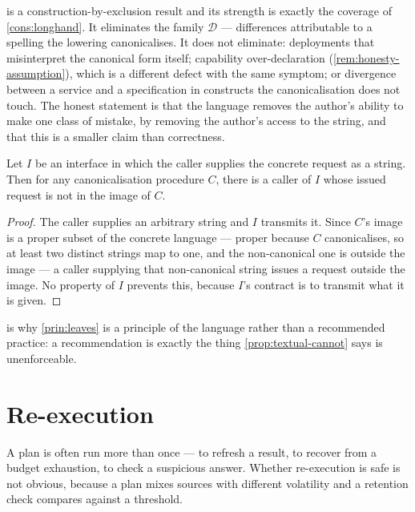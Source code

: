 \begin{remark}
\label{rem:interp-scope}
 is a construction-by-exclusion result and its strength
is exactly the coverage of \cref{cons:longhand}. It eliminates the family
$\mathcal{D}$ --- differences attributable to a spelling the lowering
canonicalises. It does not eliminate: deployments that misinterpret the
canonical form itself; capability over-declaration
(\cref{rem:honesty-assumption}), which is a different defect with the same
symptom; or divergence between a service and a specification in constructs the
canonicalisation does not touch. The honest statement is that the language
removes the author's ability to make one class of mistake, by removing the
author's access to the string, and that this is a smaller claim than
correctness.
\end{remark}

\begin{proposition}
\label{prop:textual-cannot}
Let $I$ be an interface in which the caller supplies the concrete request as a
string. Then for any canonicalisation procedure $C$, there is a caller of $I$
whose issued request is not in the image of $C$.
\end{proposition}

\begin{proof}
The caller supplies an arbitrary string and $I$ transmits it. Since $C$'s image
is a proper subset of the concrete language --- proper because $C$
canonicalises, so at least two distinct strings map to one, and the
non-canonical one is outside the image --- a caller supplying that
non-canonical string issues a request outside the image. No property of $I$
prevents this, because $I$'s contract is to transmit what it is given.
\end{proof}

 is why \cref{prin:leaves} is a principle of the
language rather than a recommended practice: a recommendation is exactly the
thing \cref{prop:textual-cannot} says is unenforceable.

\section{Re-execution}
\label{sec:idempotence}

A plan is often run more than once --- to refresh a result, to recover from a
budget exhaustion, to check a suspicious answer. Whether re-execution is safe
is not obvious, because a plan mixes sources with different volatility and a
retention check compares against a threshold.

